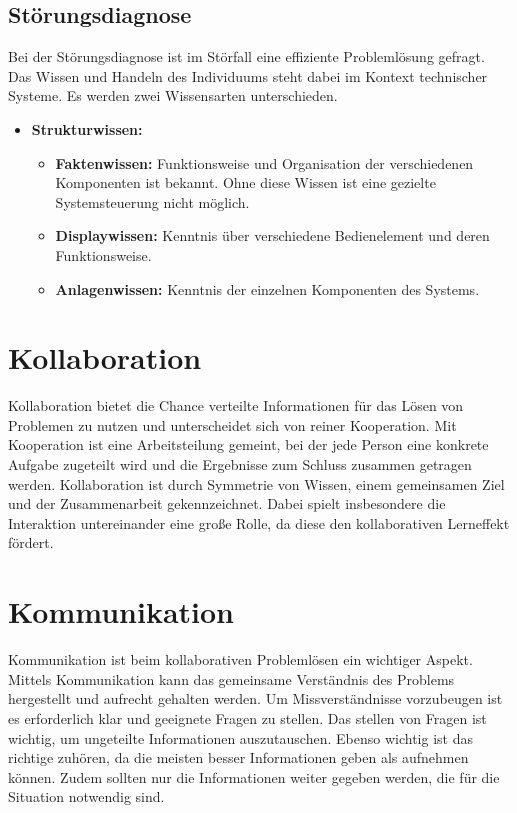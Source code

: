 \subsection{Störungsdiagnose}
Bei der Störungsdiagnose ist im Störfall eine effiziente Problemlösung gefragt. Das Wissen und Handeln des Individuums steht dabei im Kontext technischer Systeme. Es werden zwei Wissensarten unterschieden. 
\begin{itemize}
\item \textbf{Strukturwissen:} 
	\begin{itemize}
	\item \textbf{Faktenwissen:} Funktionsweise und Organisation der verschiedenen Komponenten ist bekannt. Ohne diese Wissen ist eine gezielte Systemsteuerung nicht möglich.
	\item \textbf{Displaywissen:} Kenntnis über verschiedene Bedienelement und deren Funktionsweise.
	\item \textbf{Anlagenwissen:} Kenntnis der einzelnen Komponenten des Systems.
	\end{itemize}
\end{itemize}

\section{Kollaboration}
Kollaboration bietet die Chance verteilte Informationen für das Lösen von Problemen zu nutzen und unterscheidet sich von reiner Kooperation.  Mit Kooperation ist eine Arbeitsteilung gemeint, bei der jede Person eine konkrete Aufgabe zugeteilt wird und die Ergebnisse zum Schluss zusammen getragen werden. Kollaboration ist durch Symmetrie von Wissen, einem gemeinsamen Ziel und der Zusammenarbeit gekennzeichnet. Dabei spielt insbesondere die Interaktion untereinander eine große Rolle, da diese den kollaborativen Lerneffekt fördert. 

\section{Kommunikation}
Kommunikation ist beim kollaborativen Problemlösen ein wichtiger Aspekt. Mittels Kommunikation kann das gemeinsame Verständnis des Problems hergestellt und aufrecht gehalten werden. Um Missverständnisse vorzubeugen ist es erforderlich klar und geeignete Fragen zu stellen. Das stellen von Fragen ist wichtig, um ungeteilte Informationen auszutauschen. Ebenso wichtig ist das richtige zuhören, da die meisten besser Informationen geben als aufnehmen können. Zudem sollten nur die Informationen weiter gegeben werden, die für die Situation notwendig sind.

